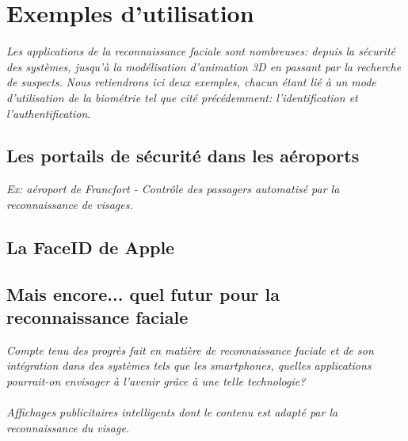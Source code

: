 \section{Exemples d'utilisation}
\textit{Les applications de la reconnaissance faciale sont nombreuses: depuis la sécurité des systèmes, jusqu'à la modélisation d'animation 3D en passant par la recherche de suspects.}
\textit{Nous retiendrons ici deux exemples, chacun étant lié à un mode d'utilisation de la biométrie tel que cité précédemment: l'identification et l'authentification}.
\subsection{Les portails de sécurité dans les aéroports}
\textit{Ex: aéroport de Francfort - Contrôle des passagers automatisé par la reconnaissance de visages.}
\subsection{La FaceID de Apple}
\subsection{Mais encore... quel futur pour la reconnaissance faciale}
\textcolor{dkblue}{\textit{Compte tenu des progrès fait en matière de reconnaissance faciale et de son intégration dans des systèmes tels que les smartphones, quelles applications pourrait-on envisager à l'avenir grâce à une telle technologie?}}
\paragraph{}
\textit{Affichages publicitaires intelligents dont le contenu est adapté par la reconnaissance du visage.}